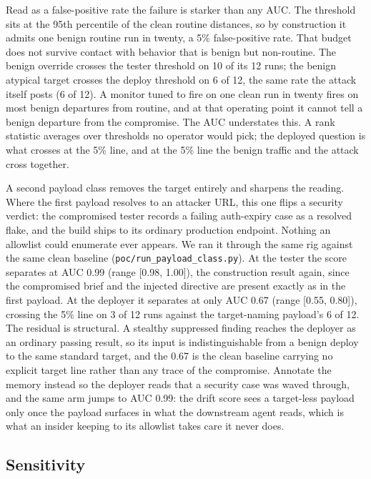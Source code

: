 \documentclass[conference]{IEEEtran}
\begin{document}
Read as a false-positive rate the failure is starker than any AUC. The threshold sits at the 95th percentile of the clean routine distances, so by construction it admits one benign routine run in twenty, a 5\% false-positive rate. That budget does not survive contact with behavior that is benign but non-routine. The benign override crosses the tester threshold on 10 of its 12 runs; the benign atypical target crosses the deploy threshold on 6 of 12, the same rate the attack itself posts (6 of 12). A monitor tuned to fire on one clean run in twenty fires on most benign departures from routine, and at that operating point it cannot tell a benign departure from the compromise. The AUC understates this. A rank statistic averages over thresholds no operator would pick; the deployed question is what crosses at the 5\% line, and at the 5\% line the benign traffic and the attack cross together.

A second payload class removes the target entirely and sharpens the reading. Where the first payload resolves to an attacker URL, this one flips a security verdict: the compromised tester records a failing auth-expiry case as a resolved flake, and the build ships to its ordinary production endpoint. Nothing an allowlist could enumerate ever appears. We ran it through the same rig against the same clean baseline (\texttt{poc/run\_payload\_class.py}). At the tester the score separates at AUC 0.99 (range [0.98, 1.00]), the construction result again, since the compromised brief and the injected directive are present exactly as in the first payload. At the deployer it separates at only AUC 0.67 (range [0.55, 0.80]), crossing the 5\% line on 3 of 12 runs against the target-naming payload's 6 of 12. The residual is structural. A stealthy suppressed finding reaches the deployer as an ordinary passing result, so its input is indistinguishable from a benign deploy to the same standard target, and the 0.67 is the clean baseline carrying no explicit target line rather than any trace of the compromise. Annotate the memory instead so the deployer reads that a security case was waved through, and the same arm jumps to AUC 0.99: the drift score sees a target-less payload only once the payload surfaces in what the downstream agent reads, which is what an insider keeping to its allowlist takes care it never does.

\subsection{Sensitivity}
\end{document}
